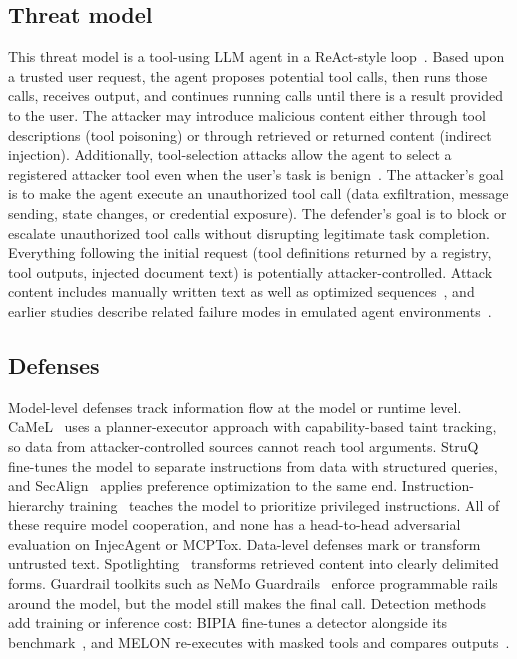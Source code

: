 \documentclass[a4paper,conference]{IEEEtran}
\begin{document}
\subsection{Threat model}
This threat model is a tool-using LLM agent in a ReAct-style loop~\cite{yao2023react}. Based upon a trusted user request, the agent proposes potential tool calls, then runs those calls, receives output, and continues running calls until there is a result provided to the user. The attacker may introduce malicious content either through tool descriptions (tool poisoning) or through retrieved or returned content (indirect injection). Additionally, tool-selection attacks allow the agent to select a registered attacker tool even when the user's task is benign~\cite{shi2025toolhijacker}. The attacker's goal is to make the agent execute an unauthorized tool call (data exfiltration, message sending, state changes, or credential exposure). The defender's goal is to block or escalate unauthorized tool calls without disrupting legitimate task completion. Everything following the initial request (tool definitions returned by a registry, tool outputs, injected document text) is potentially attacker-controlled. Attack content includes manually written text as well as optimized sequences~\cite{zou2023universal}, and earlier studies describe related failure modes in emulated agent environments~\cite{ruan2024identifying}.

\subsection{Defenses}
Model-level defenses track information flow at the model or runtime level. CaMeL~\cite{debenedetti2025camel} uses a planner-executor approach with capability-based taint tracking, so data from attacker-controlled sources cannot reach tool arguments. StruQ~\cite{chen2025struq} fine-tunes the model to separate instructions from data with structured queries, and SecAlign~\cite{chen2025secalign} applies preference optimization to the same end. Instruction-hierarchy training~\cite{wallace2024instruction} teaches the model to prioritize privileged instructions. All of these require model cooperation, and none has a head-to-head adversarial evaluation on InjecAgent or MCPTox. Data-level defenses mark or transform untrusted text. Spotlighting~\cite{hines2024defending} transforms retrieved content into clearly delimited forms. Guardrail toolkits such as NeMo Guardrails~\cite{rebedea2023nemo} enforce programmable rails around the model, but the model still makes the final call. Detection methods add training or inference cost: BIPIA fine-tunes a detector alongside its benchmark~\cite{yi2025benchmarking}, and MELON re-executes with masked tools and compares outputs~\cite{zhu2025melon}.
\end{document}
